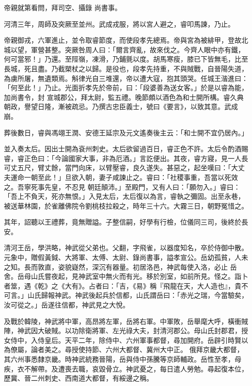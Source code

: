 \begin{pinyinscope}
 帝親就第看問，拜司空、攝錄
 尚書事。



 河清三年，周師及突厥至並州。武成戎服，將以宮人避之，睿叩馬諫，乃止。



 帝親御戎，六軍進止，並令取睿節度，而使段孝先總焉。帝與宮為被緋甲，登故北城以望，軍營甚整。突厥咎周人曰：「爾言齊亂，故來伐之。今齊人眼中亦有鐵，何可當邪！」乃還。至陘嶺，凍滑，乃鋪氈以度。胡馬寒瘦，膝已下皆無毛，比至長城，死且盡。乃截槊杖之以歸。是役也，段孝先持重，不與賊戰，自晉陽失道，為虜所屠，無遺類焉。斛律光自三堆還，帝以遭大寇，抱其頭哭。任城王湝進曰：「何至此！」乃止。光面折孝先於帝前，曰：「段婆善為送女客。」於是以睿為能，加尚書令，封
 宣城郡公，拜太尉，監五禮。晚節頗以酒色為和士開所構。睿久典朝政，譽望日隆，漸被疏忌。乃撰古忠臣義士，號曰《要言》，以致其意。武成崩。



 葬後數日，睿與馮翊王潤、安德王延宗及元文遙奏後主云：「和士開不宜仍居內。」



 並入奏太后。因出士開為袞州刺史。太后欲留過百日，睿正色不許。太后令酌酒賜睿，睿正色曰：「今論國家大事，非為厄酒。」言訖便出。其夜，睿方寢，見一人長可丈五尺，臂丈餘，當門向床，以臂壓睿，良久遂失。甚惡之，起坐嘆曰：「大丈夫運命一朝至此！」旦欲入朝，妻子咸諫止之。睿曰：「社稷事重，吾當以死效之。吾寧死事先皇，不忍見
 朝廷顛沛。」至殿門，又有人曰：「願勿入。」睿曰：「吾上不負天，死亦無恨。」入見太后，太后復以為言，睿執之彌固。出至永巷，被送華林園，於雀離佛院令劉桃枝拉殺之，時年三十六。大霧三日，朝野冤惜之。



 其年，詔聽以王禮葬，竟無贈謚。子整信嗣，好學有行檢，位儀同三司，後終於長安。



 清河王岳，學洪略，神武從父弟也。父翻，字飛雀，以器度知名，卒於侍御中散。元象中，贈假黃鉞、大將軍、太傅、太尉、錄尚書事，謚孝宣公。岳幼孤貧，人未之知。長而敦直，姿貌嶷然，深沉有器量。初居洛邑，神武每使入洛，必止
 岳舍。岳母山氏嘗夜起，見神武室中無火而有光。移於別室，如前所見。怪之。詣卜者筮，遇《乾》之《大有》。占者曰：「吉，《易》稱『飛龍在天，大人造也』，貴不可言。」山氏歸報神武。神武後起兵於信都，山氏謂岳曰：「赤光之瑞，今當驗矣，汝可從之。」岳遂往信都，神武見之大悅。



 及戰於韓陵，神武將中軍，高昂將左軍，岳將右軍。中軍敗，岳舉麾大呼，橫衝賊陣，神武因大破賊。以功除衛將軍、左光祿大夫，封清河郡公。母山氏封郡君，授女侍中，入侍皇后。天平二年，除侍中、六州軍事都督，尋加開府。岳辟引時賢以為僚屬，論者美之。尋授使持節、六州大都督、冀州大中正。
 俄拜京畿大都督，其六州事悉隸京畿。時神武統務晉陽，岳與侍中孫騰等京師輔政。岳性至孝，母疾，衣不解帶。及遭喪去職，哀毀骨立。神武憂之，每日遣人勞勉。尋起復本位，歷冀、晉二州刺史、西南道大都督，有綏邊之稱。




\end{pinyinscope}
